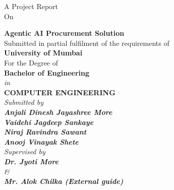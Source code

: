 
\begin{titlepage}
\thispagestyle{empty}

{\centering
{A Project Report}\\ 
\vspace{0.2cm}
{On}
\vspace{0.4cm}
\\
}
 
{\centering
\large

{\LARGE\bf Agentic AI Procurement Solution}\\
\vspace{0.5cm}
{Submitted in partial fulfilment of the requirements of } \\
\vspace{0.2cm}
{\bf{University of Mumbai}} \\
\vspace{0.2cm}
{For the Degree of} \\
\vspace{0.2cm}
{\bf {Bachelor of Engineering}} \\
{\it{in}} \\
{\bf COMPUTER ENGINEERING } \\
\vspace{0.5cm}
\it{Submitted by} \\
\vspace{.2cm}
\rm
{\large \bf {Anjali Dinesh Jayashree More}}\\
{\large \bf {Vaidehi Jagdeep Sankaye}}\\
{\large \bf {Niraj Ravindra Sawant}}\\
{\large \bf {Anooj Vinayak Shete}}\\

\vspace{0.6cm}
{\it{Supervised by}} \\
\vspace{.2cm}
\hspace{.05cm} {\large \textbf {Dr. Jyoti More}}\\
\vspace{0.2cm}
{\it{\&}} \\
\vspace{.2cm}
\hspace{.05cm} {\large \textbf {Mr. Alok Chilka (External guide)}}\\
\vspace{0.1cm}




}
\end{titlepage}
